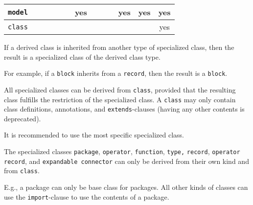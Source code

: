 \begin{center}
{\begin{tabular}{|c||c|c|c|c|c|c|c|c|c|c|c|c|}
    \hline
    {\lstinline!model!}             &                          &                           &                                            &                      &                          & \cellcolor{lightgray}yes &                          &                          &                            & \cellcolor{lightgray}yes & yes                    & \cellcolor{lightgray}yes                   \\
    \hline
    {\lstinline!class!}             &                          &                           &                                            &                      &                          &                          &                          &                          &                            &                          &                        & yes                                        \\
    \hline
\end{tabular}
\ifpdf}\else\fi%
\end{center}

If a derived class is inherited from another type of specialized class,
then the result is a specialized class of the derived class type.

\begin{nonnormative}
For example, if a \lstinline!block! inherits from a \lstinline!record!, then the result is a \lstinline!block!.
\end{nonnormative}

All specialized classes can be derived from \lstinline!class!, provided that the resulting class fulfills the restriction of the specialized class.
A \lstinline!class! may only contain class definitions, annotations, and \lstinline!extends!-clauses (having any other contents is deprecated).

\begin{nonnormative}
It is recommended to use the most specific specialized class.
\end{nonnormative}

The specialized classes \lstinline!package!, \lstinline!operator!, \lstinline!function!,
\lstinline!type,! \lstinline!record!,
\lstinline!operator record!, and \lstinline!expandable connector! can only be derived from their
own kind and from \lstinline!class!.

\begin{nonnormative}
E.g., a package can only be base class for packages.
All other kinds of classes can use the \lstinline!import!-clause to use the contents of a package.
\end{nonnormative}

